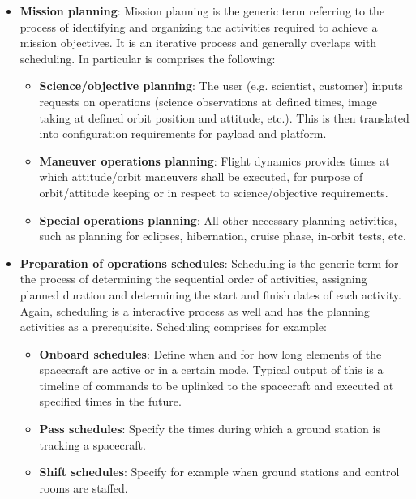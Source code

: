 \begin{itemize}
\item \textbf{Mission planning}: Mission planning is the generic term referring to the process of identifying and organizing the activities required to achieve a mission objectives. It is an iterative process and generally overlaps with scheduling. In particular is comprises the following:

	\begin{itemize}
	\item \textbf{Science/objective planning}: The user (e.g. scientist, customer) inputs requests on operations (science observations at defined times, image taking at defined orbit position and attitude, etc.). This is then translated into configuration requirements for payload and platform.

	\item \textbf{Maneuver operations planning}: Flight dynamics provides times at which attitude/orbit maneuvers shall be executed, for purpose of orbit/attitude keeping or in respect to science/objective requirements.

	\item \textbf{Special operations planning}: All other necessary planning activities, such as planning for eclipses, hibernation, cruise phase, in-orbit tests, etc.
	\end{itemize}

\item \textbf{Preparation of operations schedules}: Scheduling is the generic term for the process of determining the sequential order of activities, assigning planned duration and determining the start and finish dates of each activity. Again, scheduling is a interactive process as well and has the planning activities as a prerequisite. Scheduling comprises for example:

	\begin{itemize}
	\item \textbf{Onboard schedules}: Define when and for how long elements of the spacecraft are active or in a certain mode. Typical output of this is a timeline of commands to be uplinked to the spacecraft and executed at specified times in the future. 
	\item \textbf{Pass schedules}: Specify the times during which a ground station is tracking a spacecraft. 
	\item \textbf{Shift schedules}: Specify for example when ground stations and control rooms are staffed.
	\end{itemize}
	

\end{itemize}
